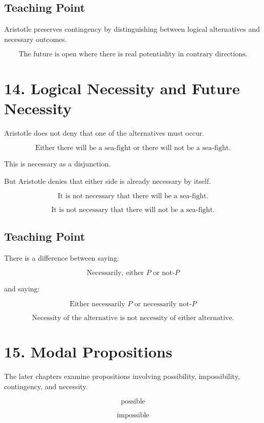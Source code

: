 \documentclass[12pt]{article}
\begin{document}
\subsection*{Teaching Point}

Aristotle preserves contingency by distinguishing between logical alternatives
and necessary outcomes.

\[
\boxed{
\text{The future is open where there is real potentiality in contrary directions.}
}
\]

\section*{14. Logical Necessity and Future Necessity}

Aristotle does not deny that one of the alternatives must occur.

\[
\text{Either there will be a sea-fight or there will not be a sea-fight.}
\]

This is necessary as a disjunction.

But Aristotle denies that either side is already necessary by itself.

\[
\text{It is not necessary that there will be a sea-fight.}
\]

\[
\text{It is not necessary that there will not be a sea-fight.}
\]

\subsection*{Teaching Point}

There is a difference between saying:

\[
\text{Necessarily, either } P \text{ or not-}P
\]

and saying:

\[
\text{Either necessarily } P \text{ or necessarily not-}P
\]

\[
\boxed{
\text{Necessity of the alternative is not necessity of either alternative.}
}
\]

\section*{15. Modal Propositions}

The later chapters examine propositions involving possibility, impossibility,
contingency, and necessity.

\[
\text{possible}
\]

\[
\text{impossible}
\]
\end{document}
